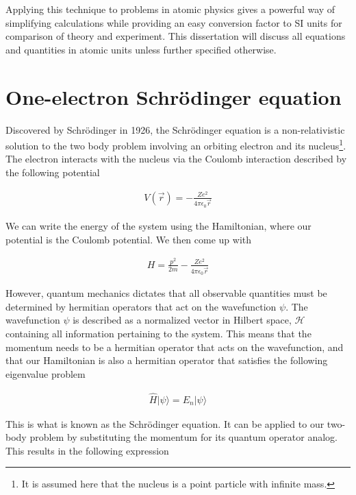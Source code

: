         Applying this technique to problems in atomic physics gives a powerful way of simplifying calculations while providing an easy conversion factor to SI units for comparison of theory and experiment. This dissertation will discuss all equations and quantities in atomic units unless further specified otherwise.


    \section{One-electron Schrödinger equation} \label{sec:Schrodinger_Equation}
        Discovered by Schrödinger in 1926, the Schrödinger equation is a non-relativistic solution to the two body problem involving an orbiting electron and its nucleus\footnote{It is assumed here that the nucleus is a point particle with infinite mass.}. The electron interacts with the nucleus via the Coulomb interaction described by the following potential

        \begin{align}
            V(\vec{r}) = -\frac{Z e^2}{4\pi \epsilon_0 \vec{r}}
        \end{align}

        \noindent We can write the energy of the system using the Hamiltonian, where our potential is the Coulomb potential. We then come up with 

        \begin{align}
            H = \frac{p^2}{2m} -\frac{Z e^2}{4\pi \epsilon_0 \vec{r}}
        \end{align}

        \noindent However, quantum mechanics dictates that all observable quantities must be determined by hermitian operators that act on the wavefunction $\psi$. The wavefunction $\psi$ is described as a normalized vector in Hilbert space, $\mathcal{H}$ containing all information pertaining to the system. This means that the momentum needs to be a hermitian operator that acts on the wavefunction, and that our Hamiltonian is also a hermitian operator that satisfies the following eigenvalue problem 

        \begin{align}
            \hat{H} \vert\psi \rangle = E_n \vert \psi \rangle
        \end{align}

        This is what is known as the Schrödinger equation. It can be applied to our two-body problem by substituting the momentum for its quantum operator analog. This results in the following expression 

